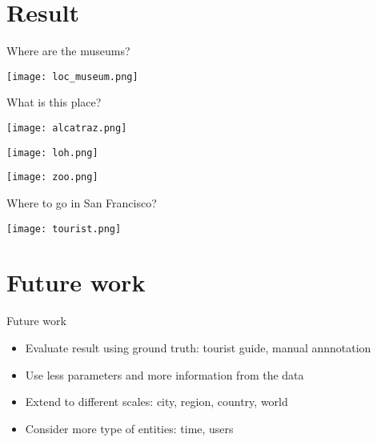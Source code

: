 \section{Result}\label{result}

\begin{frame}{Where are the museums?}

\begin{center} \texttt{[image: loc\_museum.png]} \end{center}

\end{frame}

\begin{frame}{What is this place?}

\begin{center} \texttt{[image: alcatraz.png]} \end{center}

\end{frame}

\begin{frame}

\begin{center} \texttt{[image: loh.png]} \end{center}

\end{frame}

\begin{frame}

\begin{center} \texttt{[image: zoo.png]} \end{center}

\end{frame}

\begin{frame}{Where to go in San Francisco?}

\begin{center} \texttt{[image: tourist.png]} \end{center}

\end{frame}

\section{Future work}\label{future-work}

\begin{frame}{Future work}
\begin{itemize}
\item
  Evaluate result using ground truth: tourist guide, manual annnotation
\item
  Use less parameters and more information from the data
\item
  Extend to different scales: city, region, country, world
\item
  Consider more type of entities: time, users
\end{itemize}
\end{frame}
